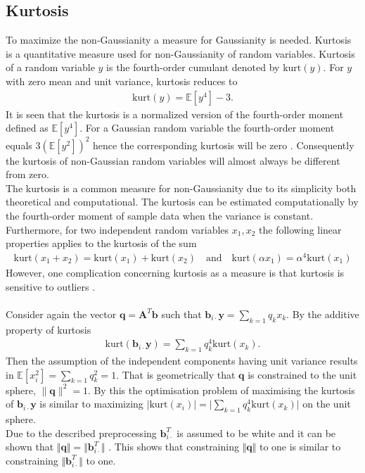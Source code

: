 \subsection{Kurtosis}
To maximize the non-Gaussianity a measure for Gaussianity is needed. Kurtosis is a quantitative measure used for non-Gaussianity of random variables. 
Kurtosis of a random variable $y$ is the fourth-order cumulant denoted by $\text{kurt}(y)$. 
For $y$ with zero mean and unit variance, kurtosis reduces to 
\begin{align*}
\text{kurt} (y) = \mathbb{E}[y^4] - 3.
\end{align*} 
It is seen that the kurtosis is a normalized version of the fourth-order moment defined as $\mathbb{E}[y^4]$. 
For a Gaussian random variable the fourth-order moment equals $3(\mathbb{E}[y^2])^2$ hence the corresponding kurtosis will be zero \cite[p. 171]{ICA}. 
Consequently the kurtosis of non-Gaussian random variables will almost always be different from zero.
\\
The kurtosis is a common measure for non-Gaussianity due to its simplicity  both theoretical and computational. 
The kurtosis can be estimated computationally by the fourth-order moment of sample data when the variance is constant.
Furthermore, for two independent random variables $x_1, x_2$ the following linear properties applies to the kurtosis of the sum
\begin{align*}
\text{kurt}(x_1 + x_2)=\text{kurt}(x_1)+ \text{kurt}(x_2) \quad \text{and} \quad \text{kurt}(\alpha x_1) = \alpha^4 \text{kurt}(x_1)
\end{align*}  
However, one complication concerning kurtosis as a measure is that kurtosis is sensitive to outliers \cite[p. 182]{ICA}.
\\ \\      
Consider again the vector $\textbf{q} = \textbf{A}^T\textbf{b}$ such that $\textbf{b}_{i \cdot} \textbf{y} = \sum_{k=1} q_k x_k$. 
By the additive property of kurtosis
\begin{align*}
\text{kurt} \left( \textbf{b}_{i \cdot} \textbf{y} \right) = \sum_{k=1}q_k^4 \text{kurt}(x_k).
\end{align*}
Then the assumption of the independent components having unit variance results in $\mathbb{E}[x_i^2]= \sum_{k=1}q_k^2=1$. 
That is geometrically that $\textbf{q}$ is constrained to the unit sphere, $\| \textbf{q}\|^2 = 1$. 
By this the optimisation problem of maximising the kurtosis of $\textbf{b}_{i \cdot} \textbf{y}$ is similar to maximizing $\vert \text{kurt}(x_i)\vert = \vert \sum_{k=1}q_k^4 \text{kurt}(x_k) \vert $ on the unit sphere.
\\
Due to the described preprocessing $\textbf{b}_{i \cdot}^T$ is assumed to be white and it can be shown that $\Vert \textbf{q} \Vert = \Vert \textbf{b}_{i \cdot}^T \Vert$ \cite[p. 174]{ICA}. 
This shows that constraining $\Vert \textbf{q} \Vert$ to one is similar to constraining $\Vert \textbf{b}_{i \cdot}^T \Vert$ to one. 

